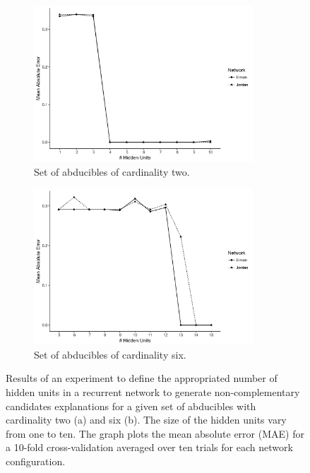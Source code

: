 \begin{figure}
	\centering
	\begin{subfigure}[b]{1.\textwidth}
	\includegraphics[width=0.9\textwidth]{figures/error_nc_2}
	\caption{Set of abducibles of cardinality two.}
	\label{fig:error_nc_2}
	\end{subfigure}
	\bigskip
	\begin{subfigure}[b]{1.0\textwidth}
  	 \includegraphics[width=0.9\textwidth]{figures/error_nc_6}
	 \caption{Set of abducibles of cardinality six.}
	\label{fig:error_nc_6}
	\end{subfigure}
	\caption{Results of an experiment to define the appropriated number of hidden units in a recurrent network to generate non-complementary candidates explanations for a given set of abducibles with cardinality two (a) and six (b). The size of the hidden units vary from one to ten. The graph plots the mean absolute error (MAE) for a 10-fold cross-validation averaged over ten trials for each network configuration.}
\end{figure}

